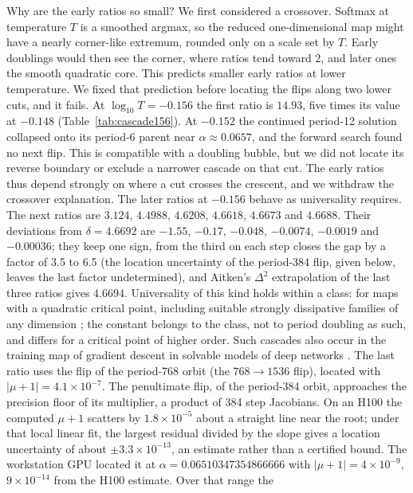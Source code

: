 \documentclass[11pt,letterpaper]{article}
\begin{document}
Why are the early ratios so small? We first considered a crossover. Softmax at temperature $T$ is a smoothed argmax,
so the reduced one-dimensional map might have a nearly corner-like extremum, rounded only on a scale set by $T$. Early
doublings would then see the corner, where ratios tend toward 2, and later ones the smooth quadratic core. This
predicts smaller early ratios at lower temperature. We fixed that prediction before locating the flips along two
lower cuts, and it fails. At $\log_{10}T=-0.156$ the first ratio is $14.93$, five times its value at $-0.148$
(Table~\ref{tab:cascade156}). At $-0.152$ the continued period-12 solution collapsed onto its period-6 parent near
$\alpha\approx0.0657$, and the forward search found no next flip. This is compatible with a doubling bubble, but we
did not locate its reverse boundary or exclude a narrower cascade on that cut. The early ratios thus depend strongly
on where a cut crosses the crescent, and we withdraw the crossover explanation. The later ratios at $-0.156$ behave as
universality requires. The next ratios are $3.124$, $4.4988$, $4.6208$, $4.6618$, $4.6673$ and $4.6688$. Their
deviations from $\delta=4.6692$ are $-1.55$, $-0.17$, $-0.048$, $-0.0074$, $-0.0019$ and $-0.00036$; they keep one
sign, from the third on each step closes the gap by a factor of 3.5 to 6.5 (the location uncertainty of the period-384
flip, given below, leaves the last factor undetermined), and Aitken's $\Delta^2$ extrapolation of the last three
ratios gives $4.6694$. Universality of this kind holds within a class: for maps with a quadratic critical point, including suitable strongly
dissipative families of any dimension \cite{feigenbaum1979universal,collet1981period}; the constant belongs to the class,
not to period doubling as such, and differs for a critical point of higher order. Such cascades also occur in the training map of gradient descent in solvable models of deep
networks \cite{hofmann2026map}. The last ratio uses the flip of the period-768 orbit (the
$768\to1536$ flip), located with $|\mu+1|=4.1\times10^{-7}$. The penultimate flip, of the period-384 orbit,
approaches the precision floor of its multiplier, a product of 384 step Jacobians. On an H100 the computed $\mu+1$
scatters by $1.8\times10^{-5}$ about a straight line near the root; under that local linear fit, the largest residual
divided by the slope gives a location uncertainty of about $\pm3.3\times10^{-13}$, an estimate rather than a
certified bound. The workstation GPU located it at
$\alpha=0.06510347354866666$ with $|\mu+1|=4\times10^{-9}$, $9\times10^{-14}$ from the H100 estimate. Over that range the
\end{document}
